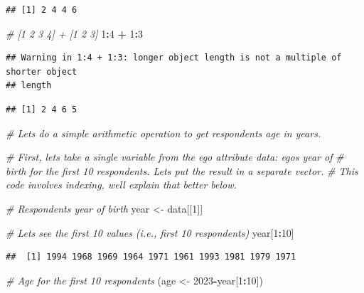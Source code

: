 \documentclass[
]{book}
\newenvironment{Shaded}{\begin{snugshade}}{\end{snugshade}}
\newcommand{\CommentTok}[1]{\textcolor[rgb]{0.56,0.35,0.01}{\textit{#1}}}
\newcommand{\DecValTok}[1]{\textcolor[rgb]{0.00,0.00,0.81}{#1}}
\newcommand{\NormalTok}[1]{#1}
\newcommand{\OtherTok}[1]{\textcolor[rgb]{0.56,0.35,0.01}{#1}}
\newcommand{\SpecialCharTok}[1]{\textcolor[rgb]{0.81,0.36,0.00}{\textbf{#1}}}
\begin{document}
\begin{verbatim}
## [1] 2 4 4 6
\end{verbatim}

\begin{Shaded}
\begin{Highlighting}[]
\CommentTok{\# [1 2 3 4] + [1 2 3]}
\DecValTok{1}\SpecialCharTok{:}\DecValTok{4} \SpecialCharTok{+} \DecValTok{1}\SpecialCharTok{:}\DecValTok{3}
\end{Highlighting}
\end{Shaded}

\begin{verbatim}
## Warning in 1:4 + 1:3: longer object length is not a multiple of shorter object
## length
\end{verbatim}

\begin{verbatim}
## [1] 2 4 6 5
\end{verbatim}

\begin{Shaded}
\begin{Highlighting}[]
\CommentTok{\# Let\textquotesingle{}s do a simple arithmetic operation to get respondents\textquotesingle{} age in years.}

\CommentTok{\# First, let\textquotesingle{}s take a single variable from the ego attribute data: ego\textquotesingle{}s year of }
\CommentTok{\# birth for the first 10 respondents. Let\textquotesingle{}s put the result in a separate vector. }
\CommentTok{\# This code involves indexing, we\textquotesingle{}ll explain that better below.}

\CommentTok{\# Respondents\textquotesingle{} year of birth}
\NormalTok{year }\OtherTok{\textless{}{-}}\NormalTok{ data[[}\DecValTok{1}\NormalTok{]]}

\CommentTok{\# Let\textquotesingle{}s see the first 10 values (i.e., first 10 respondents)}
\NormalTok{year[}\DecValTok{1}\SpecialCharTok{:}\DecValTok{10}\NormalTok{]}
\end{Highlighting}
\end{Shaded}

\begin{verbatim}
##  [1] 1994 1968 1969 1964 1971 1961 1993 1981 1979 1971
\end{verbatim}

\begin{Shaded}
\begin{Highlighting}[]
\CommentTok{\# Age for the first 10 respondents}
\NormalTok{(age }\OtherTok{\textless{}{-}} \DecValTok{2023}\SpecialCharTok{{-}}\NormalTok{year[}\DecValTok{1}\SpecialCharTok{:}\DecValTok{10}\NormalTok{])}
\end{Highlighting}
\end{Shaded}
\end{document}
